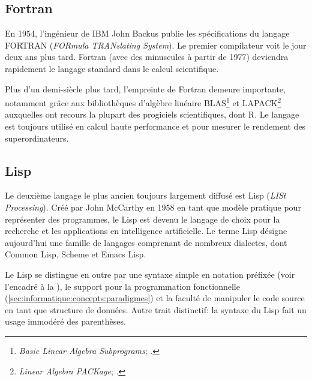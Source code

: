 \subsection{Fortran}
\label{sec:informatique:historique:fortran}

En 1954, l'ingénieur de IBM John Backus publie les spécifications du
langage FORTRAN (\emph{FORmula TRANslating System}). Le
premier compilateur voit le jour deux ans plus tard. Fortran (avec des
minuscules à partir de 1977) deviendra rapidement le langage standard
dans le calcul scientifique.

Plus d'un demi-siècle plus tard, l'empreinte de Fortran demeure
importante, notamment grâce aux bibliothèques d'algèbre linéaire
BLAS\footnote{%
  \emph{Basic Linear Algebra Subprograms};
  .} %
et LAPACK\footnote{%
  \emph{Linear Algebra PACKage};
  .} %
auxquelles ont recours la plupart des progiciels scientifiques, dont
R. Le langage est toujours utilisé en calcul haute performance et pour
mesurer le rendement des superordinateurs.


\subsection{Lisp}
\label{sec:informatique:historique:lisp}

Le deuxième langage le plus ancien toujours largement diffusé est
Lisp (\emph{LISt Processing}). Créé par John McCarthy en
1958 en tant que modèle pratique pour représenter des programmes, le
Lisp est devenu le langage de choix pour la recherche et les
applications en intelligence artificielle. Le terme Lisp désigne
aujourd'hui une famille de langages comprenant de nombreux dialectes,
dont Common Lisp, Scheme et Emacs Lisp.

Le Lisp se distingue en outre par une syntaxe simple en
notation préfixée (voir l'encadré à la
), le support pour la
programmation fonctionnelle
(\autoref{sec:informatique:concepts:paradigmes}) et la faculté de
manipuler le code source en tant que structure de données. Autre trait
distinctif: la syntaxe du Lisp fait un usage immodéré des parenthèses.

